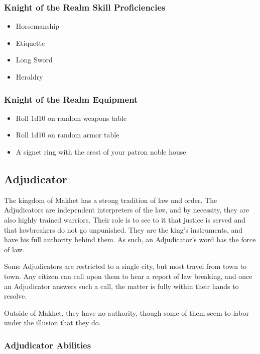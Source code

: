 \begin{multicols}{2}
\subsubsection{Knight of the Realm Skill Proficiencies}

\begin{itemize}
  \item Horsemanship
  \item Etiquette
  \item Long Sword
  \item Heraldry
\end{itemize}

\subsubsection{Knight of the Realm Equipment}

\begin{itemize}
  \item Roll 1d10 on random weapons table
  \item Roll 1d10 on random armor table
  \item A signet ring with the crest of your patron noble house
\end{itemize}

\subsection{Adjudicator}

The kingdom of Makhet has a strong tradition of law and order. The
Adjudicators are independent interpreters of the law, and by necessity,
they are also highly trained warriors. Their role is to see to it that
justice is served and that lawbreakers do not go unpunished. They are
the king's instruments, and have his full authority behind them. As
such, an Adjudicator's word has the force of law.

Some Adjudicators are restricted to a single city, but most travel from
town to town. Any citizen can call upon them to hear a report of law
breaking, and once an Adjudicator answers such a call, the matter is
fully within their hands to resolve.

Outside of Makhet, they have no authority, though some of them seem to
labor under the illusion that they do.

\subsubsection{Adjudicator Abilities}


\end{multicols}
